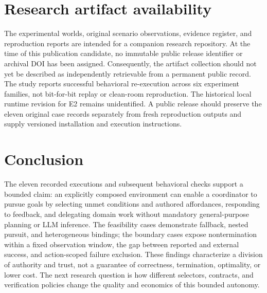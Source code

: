 \documentclass[11pt]{article}
\begin{document}
\section{Research artifact availability}
The experimental worlds, original scenario observations, evidence register, and reproduction reports are intended for a companion research repository. At the time of this publication candidate, no immutable public release identifier or archival DOI has been assigned. Consequently, the artifact collection should not yet be described as independently retrievable from a permanent public record. The study reports successful behavioral re-execution across six experiment families, not bit-for-bit replay or clean-room reproduction. The historical local runtime revision for E2 remains unidentified. A public release should preserve the eleven original case records separately from fresh reproduction outputs and supply versioned installation and execution instructions.

\section{Conclusion}
The eleven recorded executions and subsequent behavioral checks support a bounded claim: an explicitly composed environment can enable a coordinator to pursue goals by selecting unmet conditions and authored affordances, responding to feedback, and delegating domain work without mandatory general-purpose planning or LLM inference. The feasibility cases demonstrate fallback, nested pursuit, and heterogeneous bindings; the boundary cases expose nontermination within a fixed observation window, the gap between reported and external success, and action-scoped failure exclusion. These findings characterize a division of authority and trust, not a guarantee of correctness, termination, optimality, or lower cost. The next research question is how different selectors, contracts, and verification policies change the quality and economics of this bounded autonomy.
\end{document}
